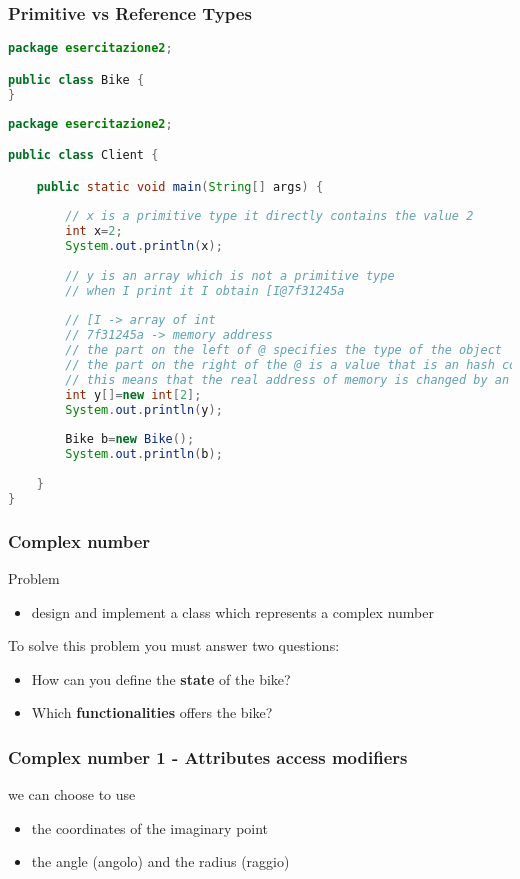 \documentclass{article}
\begin{document}
\subsubsection{Primitive vs Reference Types}
\begin{lstlisting}[language=Java,escapechar=|]
package esercitazione2;

public class Bike {	
}
\end{lstlisting}

\begin{lstlisting}[language=Java,escapechar=|]
package esercitazione2;

public class Client {

	public static void main(String[] args) {
		
		// x is a primitive type it directly contains the value 2
		int x=2;
		System.out.println(x);
		
		// y is an array which is not a primitive type 
		// when I print it I obtain [I@7f31245a
		
		// [I -> array of int
		// 7f31245a -> memory address
		// the part on the left of @ specifies the type of the object
		// the part on the right of the @ is a value that is an hash code of the memory address in which the object is allocated
		// this means that the real address of memory is changed by an hashing function before being printed
		int y[]=new int[2];
		System.out.println(y);
		
		Bike b=new Bike();
		System.out.println(b);
		
	}
}
\end{lstlisting}

\subsubsection{Complex number}
Problem
\begin{itemize}
\item  design and implement a class which represents a complex number
\end{itemize}

To solve this problem you must answer two questions:
\begin{itemize}
\item How can you define the \textbf{state} of the bike?
\item Which \textbf{functionalities} offers the bike?
\end{itemize}
 
\subsubsection{Complex number 1 - Attributes access modifiers}
we can choose to use
\begin{itemize}
\item  the coordinates of the imaginary point
\item the angle (angolo) and the radius (raggio)
\end{itemize}
\end{document}
